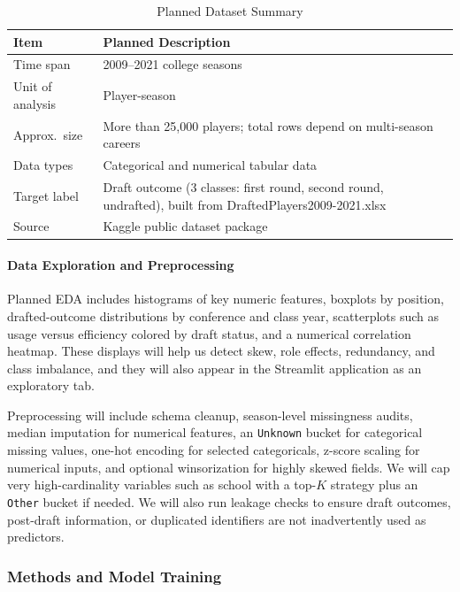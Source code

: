 \begin{table}[h]
\caption{Planned Dataset Summary}
\label{tab:dataset_summary}
\centering
\begin{tabularx}{\columnwidth}{|l|X|}
\hline
\textbf{Item} & \textbf{Planned Description} \\
\hline
Time span & 2009--2021 college seasons \\
\hline
Unit of analysis & Player-season \\
\hline
Approx.\ size & More than 25,000 players; total rows depend on multi-season careers \\
\hline
Data types & Categorical and numerical tabular data \\
\hline
Target label & Draft outcome (3 classes: first round, second round, undrafted), built from DraftedPlayers2009-2021.xlsx \\
\hline
Source & Kaggle public dataset package \\
\hline
\end{tabularx}
\end{table}

\paragraph{Data Exploration and Preprocessing}
Planned EDA includes histograms of key numeric features, boxplots by position, drafted-outcome distributions by conference and class year, scatterplots such as usage versus efficiency colored by draft status, and a numerical correlation heatmap. These displays will help us detect skew, role effects, redundancy, and class imbalance, and they will also appear in the Streamlit application as an exploratory tab.

Preprocessing will include schema cleanup, season-level missingness audits, median imputation for numerical features, an \texttt{Unknown} bucket for categorical missing values, one-hot encoding for selected categoricals, z-score scaling for numerical inputs, and optional winsorization for highly skewed fields. We will cap very high-cardinality variables such as school with a top-$K$ strategy plus an \texttt{Other} bucket if needed. We will also run leakage checks to ensure draft outcomes, post-draft information, or duplicated identifiers are not inadvertently used as predictors.

\subsubsection{Methods and Model Training}


